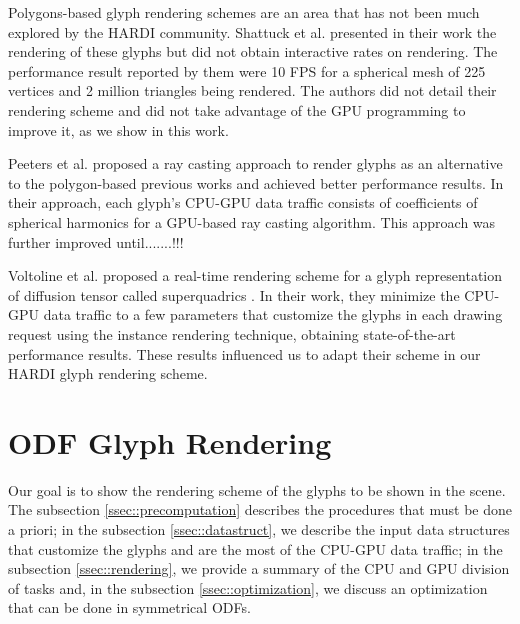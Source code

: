 \documentclass[twoside,twocolumn,10pt]{article}
\begin{document}
Polygons-based glyph rendering schemes are an area that has not been much explored by the HARDI community. Shattuck et al. \cite{shattuck2008} presented in their work the rendering of these glyphs but did not obtain interactive rates on rendering. The performance result reported by them were 10 FPS for a spherical mesh of 225 vertices and 2 million triangles being rendered. The authors did not detail their rendering scheme and did not take advantage of the GPU programming to improve it, as we show in this work.



Peeters et al. \cite{peeters2009} proposed a ray casting approach to render glyphs as an alternative to the polygon-based previous works and achieved better performance results. In their approach, each glyph's CPU-GPU data traffic consists of coefficients of spherical harmonics for a GPU-based ray casting algorithm. This approach was further improved until.......!!!

Voltoline et al. \cite{voltoline2021} proposed a real-time rendering scheme for a glyph representation of diffusion tensor called superquadrics \cite{Kindlmann2004}. In their work, they minimize the CPU-GPU data traffic to a few parameters that customize the glyphs in each drawing request using the instance rendering technique, obtaining state-of-the-art performance results. These results influenced us to adapt their scheme in our HARDI glyph rendering scheme.


\section{ODF Glyph Rendering}
\label{sec::odf_glyph_rendering}

Our goal is to show the rendering scheme of the glyphs to be shown in the scene. The subsection \ref{ssec::precomputation} describes the procedures that must be done a priori; in the subsection \ref{ssec::datastruct}, we describe the input data structures that customize the glyphs and are the most of the CPU-GPU data traffic; in the subsection \ref{ssec::rendering}, we provide a summary of the CPU and GPU division of tasks and, in the subsection \ref{ssec::optimization}, we discuss an optimization that can be done in symmetrical ODFs.
\end{document}
